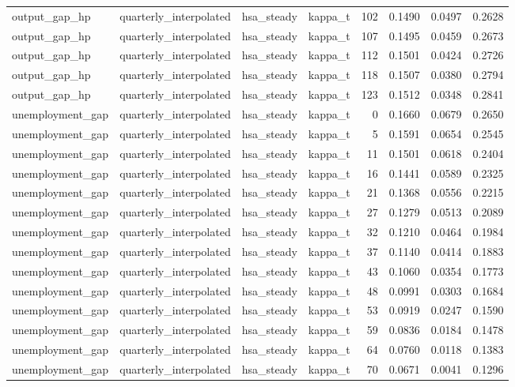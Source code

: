 \begin{tabular}{llllrrrr}
output\_gap\_hp & quarterly\_interpolated & hsa\_steady & kappa\_t & 102 & 0.1490 & 0.0497 & 0.2628 \\
output\_gap\_hp & quarterly\_interpolated & hsa\_steady & kappa\_t & 107 & 0.1495 & 0.0459 & 0.2673 \\
output\_gap\_hp & quarterly\_interpolated & hsa\_steady & kappa\_t & 112 & 0.1501 & 0.0424 & 0.2726 \\
output\_gap\_hp & quarterly\_interpolated & hsa\_steady & kappa\_t & 118 & 0.1507 & 0.0380 & 0.2794 \\
output\_gap\_hp & quarterly\_interpolated & hsa\_steady & kappa\_t & 123 & 0.1512 & 0.0348 & 0.2841 \\
unemployment\_gap & quarterly\_interpolated & hsa\_steady & kappa\_t & 0 & 0.1660 & 0.0679 & 0.2650 \\
unemployment\_gap & quarterly\_interpolated & hsa\_steady & kappa\_t & 5 & 0.1591 & 0.0654 & 0.2545 \\
unemployment\_gap & quarterly\_interpolated & hsa\_steady & kappa\_t & 11 & 0.1501 & 0.0618 & 0.2404 \\
unemployment\_gap & quarterly\_interpolated & hsa\_steady & kappa\_t & 16 & 0.1441 & 0.0589 & 0.2325 \\
unemployment\_gap & quarterly\_interpolated & hsa\_steady & kappa\_t & 21 & 0.1368 & 0.0556 & 0.2215 \\
unemployment\_gap & quarterly\_interpolated & hsa\_steady & kappa\_t & 27 & 0.1279 & 0.0513 & 0.2089 \\
unemployment\_gap & quarterly\_interpolated & hsa\_steady & kappa\_t & 32 & 0.1210 & 0.0464 & 0.1984 \\
unemployment\_gap & quarterly\_interpolated & hsa\_steady & kappa\_t & 37 & 0.1140 & 0.0414 & 0.1883 \\
unemployment\_gap & quarterly\_interpolated & hsa\_steady & kappa\_t & 43 & 0.1060 & 0.0354 & 0.1773 \\
unemployment\_gap & quarterly\_interpolated & hsa\_steady & kappa\_t & 48 & 0.0991 & 0.0303 & 0.1684 \\
unemployment\_gap & quarterly\_interpolated & hsa\_steady & kappa\_t & 53 & 0.0919 & 0.0247 & 0.1590 \\
unemployment\_gap & quarterly\_interpolated & hsa\_steady & kappa\_t & 59 & 0.0836 & 0.0184 & 0.1478 \\
unemployment\_gap & quarterly\_interpolated & hsa\_steady & kappa\_t & 64 & 0.0760 & 0.0118 & 0.1383 \\
unemployment\_gap & quarterly\_interpolated & hsa\_steady & kappa\_t & 70 & 0.0671 & 0.0041 & 0.1296 \\

\end{tabular}
